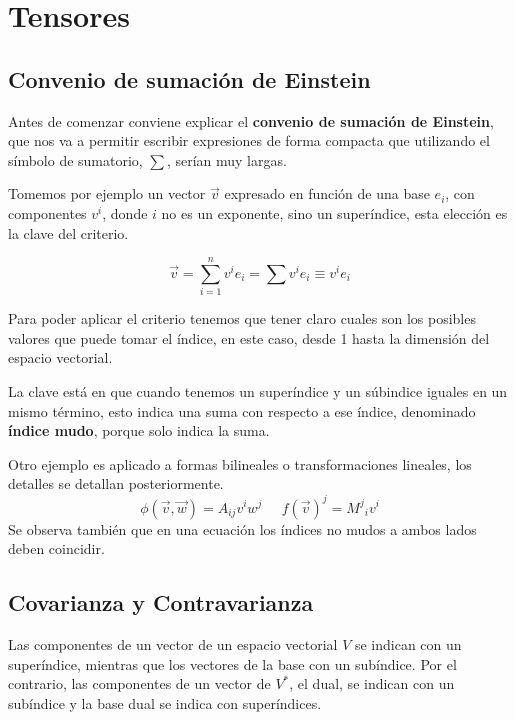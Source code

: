 \section{Tensores}
\subsection{Convenio de sumación de Einstein}
Antes de comenzar conviene explicar el \textbf{convenio de sumación de Einstein}, que nos va a permitir escribir expresiones de forma compacta que utilizando el símbolo de sumatorio, $\sum$, serían muy largas.

Tomemos por ejemplo un vector $\vec{v}$ expresado en función de una base $e_i$, con componentes $v^i$, donde $i$ no es un exponente, sino un superíndice, esta elección es la clave del criterio.

\[\vec{v}=\sum_{i=1}^n{v^i e_i}=\sum{v^i e_i}\equiv v^i e_i\]

Para poder aplicar el criterio tenemos que tener claro cuales son los posibles valores que puede tomar el índice, en este caso, desde 1 hasta la dimensión del espacio vectorial.

La clave está en que cuando tenemos un superíndice y un súbindice iguales en un mismo término, esto indica una suma con respecto a ese índice, denominado \textbf{índice mudo}, porque solo indica la suma.

Otro ejemplo es aplicado a formas bilineales o transformaciones lineales, los detalles se detallan posteriormente.
\[\phi(\vec{v},\vec{w})=A_{ij} v^i w^j \;\;\;\;\; {f(\vec{v})}^j={M^j}_i v^i\]
Se observa también que en una ecuación los índices no mudos a ambos lados deben coincidir.
\subsection{Covarianza y Contravarianza}
Las componentes de un vector de un espacio vectorial $V$ se indican con un superíndice, mientras que los vectores de la base con un subíndice. Por el contrario, las componentes de un vector de $V^*$, el dual, se indican con un subíndice y la base dual se indica con superíndices.